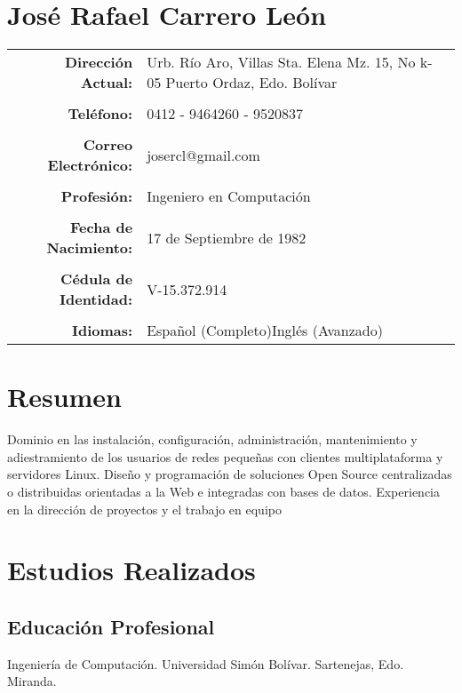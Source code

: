 \documentclass[letterpaper,11pt]{report}
\begin{document}
\section*{José Rafael Carrero León}

\begin{tabular}{r p{2.4in} p{46mm}}
\textbf{Dirección Actual:}&Urb. Río Aro, Villas Sta. Elena\newline
Mz. 15, No k-05 \newline
Puerto Ordaz, Edo. Bolívar &  \\%
 & & \\
\textbf{Teléfono:}&0412 - 9464260\newline 0286 - 9520837&\\
 & & \\
\textbf{Correo Electrónico:}&josercl@gmail.com&\\
 & & \\
\textbf{Profesión:}&Ingeniero en Computación&\\
 & & \\
\textbf{Fecha de Nacimiento:}&17 de Septiembre de 1982&\\
 & & \\
\textbf{Cédula de Identidad:}&V-15.372.914&\\
 & & \\
\textbf{Idiomas:}&Espa\~{n}ol (Completo)\newline Inglés (Avanzado)&\\
\end{tabular}


\section*{Resumen}
Dominio en las instalación, configuración, administración, mantenimiento y adiestramiento de los usuarios de redes peque\~{n}as con clientes multiplataforma y servidores Linux. Dise\~{n}o y programación de soluciones Open Source centralizadas o distribuidas orientadas a la Web e integradas con bases de datos. Experiencia en la dirección de proyectos y el trabajo en equipo

\section*{Estudios Realizados}
\subsection*{Educación Profesional}
Ingeniería de Computación. Universidad Simón Bolívar. Sartenejas, Edo. Miranda.
\end{document}
